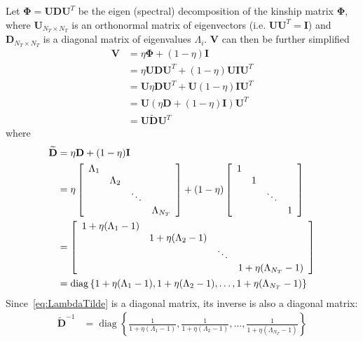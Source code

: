 \documentclass[12pt,letter]{article}\usepackage[]{graphicx}\usepackage[]{color}
\newcommand{\bD}{\textbf{D}}
\newcommand{\bU}{\textbf{U}}
\newcommand{\bV}{\textbf{V}}
\newcommand{\bI}{\textbf{I}}
\newcommand{\bPhi}{\boldsymbol{\Phi}}
\DeclareMathOperator{\diag}{diag} %
\begin{document}
Let $\bPhi = \bU \bD \bU^T$ be the eigen (spectral) decomposition of the kinship matrix $\bPhi$, where $\bU_{N_T \times N_T}$ is an orthonormal matrix of eigenvectors (i.e. $\bU \bU^T = \bI$) and $\bD_{N_T \times N_T}$ is a diagonal matrix of eigenvalues $\Lambda_i$. $\bV$ can then be further simplified~\citep{pirinen2013efficient}
\begin{align}
	\bV & = \eta \bPhi + (1-\eta) \bI \nonumber \\
	& = \eta \bU \bD \bU^T + (1-\eta) \bU \bI \bU^T \nonumber \\
	& = \bU \eta  \bD \bU^T + \bU (1-\eta) \bI \bU^T \nonumber \\
	& = \bU \left(\eta  \bD + (1-\eta) \bI\right) \bU^T \nonumber \\
	& = \bU \widetilde{\bD} \bU^T  \label{eq:Vsimplified}
\end{align}
where
\begin{align}
	\widetilde{\bD} & = \eta  \bD + (1-\eta) \bI  \label{eq:LambdaTilde} \\
	& =  \eta \left[ \begin{array}{cccc}
		\Lambda_1 & \hfill & \hfill & \hfill  \\
		\hfill & \Lambda_2 & \hfill & \hfill  \\
		\hfill & \hfill & \ddots &\hfill  \\
		\hfill & \hfill & \hfill & \Lambda_{N_T}  \\
	\end{array} \right] + (1-\eta) \left[ \begin{array}{cccc}
	1 & \hfill & \hfill & \hfill  \\
	\hfill & 1 & \hfill & \hfill  \\
	\hfill & \hfill & \ddots &\hfill  \\
	\hfill & \hfill & \hfill & 1  \\
\end{array} \right]  \nonumber \\
& =   \left[ \begin{array}{cccc}
	1 + \eta (\Lambda_1-1) & \hfill & \hfill & \hfill  \\
	\hfill & 1 + \eta (\Lambda_2-1) & \hfill & \hfill  \\
	\hfill & \hfill & \ddots &\hfill  \\
	\hfill & \hfill & \hfill & 1 + \eta (\Lambda_{N_T}-1)  \\
\end{array} \right]   \nonumber \\
& = \diag\left\lbrace 1 + \eta (\Lambda_1-1), 1 + \eta (\Lambda_2-1), \ldots, 1 + \eta (\Lambda_{N_T}-1) \label{eq:DiagLambda} \right\rbrace
\end{align}
Since~\eqref{eq:LambdaTilde} is a diagonal matrix, its inverse is also a diagonal matrix:
\begin{align}
	\widetilde{\bD}^{-1} & = \diag\left\lbrace \frac{1}{1 + \eta (\Lambda_1-1)}, \frac{1}{1 + \eta (\Lambda_2-1)}, \ldots, \frac{1}{1 + \eta (\Lambda_{N_T}-1)} \label{eq:DiagInvLambda} \right\rbrace
\end{align}
\end{document}
